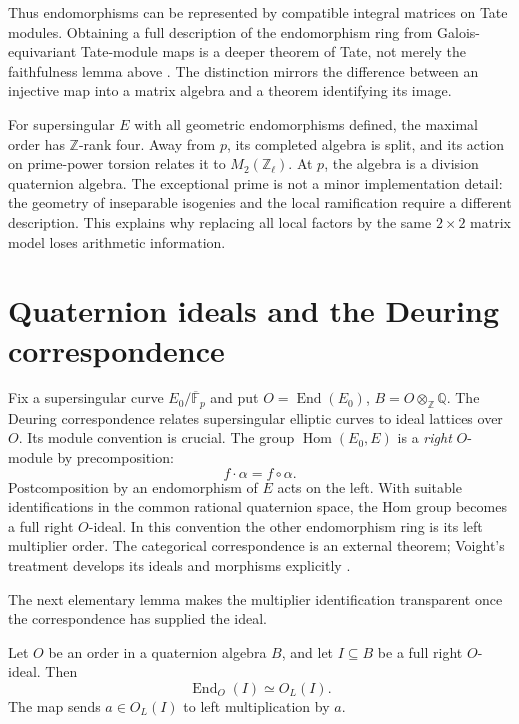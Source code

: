 Thus endomorphisms can be represented by compatible integral
matrices on Tate modules. Obtaining a full description of the
endomorphism ring from Galois-equivariant Tate-module maps is a
deeper theorem of Tate, not merely the faithfulness lemma above
\cite{Tate1966Endomorphisms}. The distinction mirrors the
difference between an injective map into a matrix algebra and
a theorem identifying its image.

For supersingular $E$ with all geometric endomorphisms defined,
the maximal order has $\mathbb Z$-rank four. Away from $p$, its
completed algebra is split, and its action on prime-power torsion
relates it to $M_2(\mathbb Z_\ell)$. At $p$, the algebra is a
division quaternion algebra. The exceptional prime is not a
minor implementation detail: the geometry of inseparable
isogenies and the local ramification require a different
description. This explains why replacing all local factors by
the same $2\times2$ matrix model loses arithmetic information.

\section{Quaternion ideals and the Deuring correspondence}

Fix a supersingular curve $E_0/\overline{\mathbb F}_p$ and put
$O=\operatorname{End}(E_0)$,
$B=O\otimes_{\mathbb Z}\mathbb Q$. The Deuring correspondence
relates supersingular elliptic curves to ideal lattices over $O$.
Its module convention is crucial. The group
$\operatorname{Hom}(E_0,E)$ is a \emph{right} $O$-module by
precomposition:
\[
 f\cdot\alpha=f\circ\alpha.
\]
Postcomposition by an endomorphism of $E$ acts on the left.
With suitable identifications in the common rational quaternion
space, the Hom group becomes a full right $O$-ideal. In this
convention the other endomorphism ring is its left multiplier
order. The categorical correspondence is an external theorem;
Voight's treatment develops its ideals and morphisms explicitly
\cite[\S42.3]{Voight2021Supersingular}.

The next elementary lemma makes the multiplier identification
transparent once the correspondence has supplied the ideal.

\begin{lemma}
\label{lem:right-ideal-end}
Let $O$ be an order in a quaternion algebra $B$, and let
$I\subseteq B$ be a full right $O$-ideal. Then
\[
 \operatorname{End}_O(I)\simeq O_L(I).
\]
The map sends $a\in O_L(I)$ to left multiplication by $a$.
\end{lemma}

